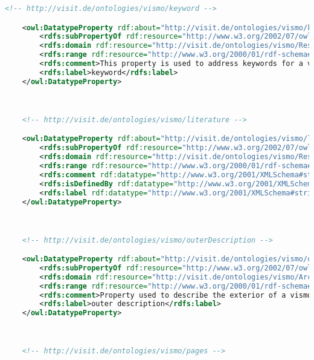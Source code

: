 \begin{lstlisting}[caption={VisMo Ontologie in der letzten (englischen) Version.},label={lst:vismo},captionpos=b,language=xml]
    <!-- http://visit.de/ontologies/vismo/keyword -->

    <owl:DatatypeProperty rdf:about="http://visit.de/ontologies/vismo/keyword">
        <rdfs:subPropertyOf rdf:resource="http://www.w3.org/2002/07/owl#topDataProperty"/>
        <rdfs:domain rdf:resource="http://visit.de/ontologies/vismo/Resource"/>
        <rdfs:range rdf:resource="http://www.w3.org/2000/01/rdf-schema#Literal"/>
        <rdfs:comment>This property is used to address keywords for a vismo:Resource entity. These refer to more general topics that can be addressed to anything out of the VisMo domain, for example &quot;Trade&quot;, &quot;War&quot;/&quot;Peace&quot;, or overall temporal associations.</rdfs:comment>
        <rdfs:label>keyword</rdfs:label>
    </owl:DatatypeProperty>
    


    <!-- http://visit.de/ontologies/vismo/literature -->

    <owl:DatatypeProperty rdf:about="http://visit.de/ontologies/vismo/literature">
        <rdfs:subPropertyOf rdf:resource="http://www.w3.org/2002/07/owl#topDataProperty"/>
        <rdfs:domain rdf:resource="http://visit.de/ontologies/vismo/Resource"/>
        <rdfs:range rdf:resource="http://www.w3.org/2000/01/rdf-schema#Literal"/>
        <rdfs:comment rdf:datatype="http://www.w3.org/2001/XMLSchema#string">This property defines a literature entry that contains further information about the given vismo entity.</rdfs:comment>
        <rdfs:isDefinedBy rdf:datatype="http://www.w3.org/2001/XMLSchema#string">http://visit.de/ontologies/vismo/</rdfs:isDefinedBy>
        <rdfs:label rdf:datatype="http://www.w3.org/2001/XMLSchema#string">literature</rdfs:label>
    </owl:DatatypeProperty>
    


    <!-- http://visit.de/ontologies/vismo/outerDescription -->

    <owl:DatatypeProperty rdf:about="http://visit.de/ontologies/vismo/outerDescription">
        <rdfs:subPropertyOf rdf:resource="http://www.w3.org/2002/07/owl#topDataProperty"/>
        <rdfs:domain rdf:resource="http://visit.de/ontologies/vismo/Architecture"/>
        <rdfs:range rdf:resource="http://www.w3.org/2000/01/rdf-schema#Literal"/>
        <rdfs:comment>Property used to describe the exterior of a vismo:Architecture entity.</rdfs:comment>
        <rdfs:label>outer description</rdfs:label>
    </owl:DatatypeProperty>
    


    <!-- http://visit.de/ontologies/vismo/pages -->


\end{lstlisting}
